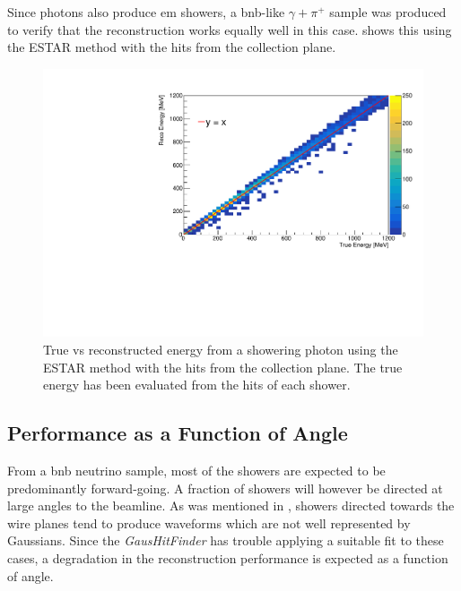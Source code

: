 Since photons also produce \gls{em} showers, a \gls{bnb}-like $\gamma + \pi^+$ sample was produced to verify that the reconstruction works equally well in this case.  shows this using the ESTAR method with the hits from the collection plane. 

\begin{figure}
    \centering
    \includegraphics[width = \largefigwidth]{figures-chap4/true_vs_reco_photon_ESTAR.pdf}
    \caption[True vs reconstructed energy from a showering photon using the ESTAR method. The true energy has been evaluated from the hits of each shower.]{True vs reconstructed energy from a showering photon using the ESTAR method with the hits from the collection plane. The true energy has been evaluated from the hits of each shower.}
    \label{fig:true_vs_reco_photon_sample}
\end{figure}

\newpage
\subsection{Performance as a Function of Angle}

From a \gls{bnb} neutrino sample, most of the showers are expected to be predominantly forward-going. A fraction of showers will however be directed at large angles to the beamline. As was mentioned in , showers directed towards the wire planes tend to produce waveforms which are not well represented by Gaussians. Since the \textit{GausHitFinder} has trouble applying a suitable fit to these cases, a degradation in the reconstruction performance is expected as a function of angle.

